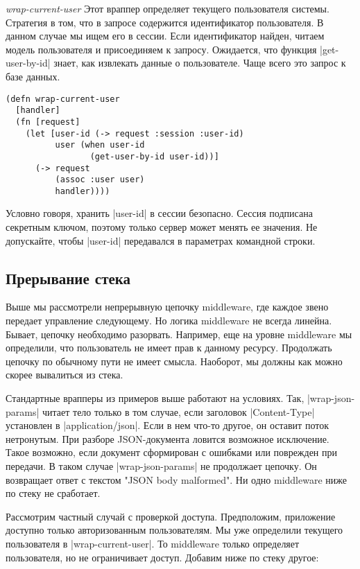\emph{wrap-current-user} Этот враппер определяет текущего пользователя
системы. Стратегия в том, что в запросе содержится идентификатор пользователя. В
данном случае мы ищем его в сессии. Если идентификатор найден, читаем модель
пользователя и присоединяем к запросу. Ожидается, что функция
\spverb|get-user-by-id| знает, как извлекать данные о пользователе. Чаще всего
это запрос к базе данных.

\begin{verbatim}
(defn wrap-current-user
  [handler]
  (fn [request]
    (let [user-id (-> request :session :user-id)
          user (when user-id
                 (get-user-by-id user-id))]
      (-> request
          (assoc :user user)
          handler))))
\end{verbatim}

Условно говоря, хранить \spverb|user-id| в сессии безопасно. Сессия подписана секретным
ключом, поэтому только сервер может менять ее значения. Не допускайте, чтобы
\spverb|user-id| передавался в параметрах командной строки.

\subsection{Прерывание стека}

Выше мы рассмотрели непрерывную цепочку middleware, где каждое звено передает
управление следующему. Но логика middleware не всегда линейна. Бывает, цепочку
необходимо разорвать. Например, еще на уровне middleware мы определили, что
пользователь не имеет прав к данному ресурсу. Продолжать цепочку по обычному
пути не имеет смысла. Наоборот, мы должны как можно скорее вывалиться из стека.

Стандартные врапперы из примеров выше работают на условиях. Так,
\spverb|wrap-json-params| читает тело только в том случае, если заголовок
\spverb|Content-Type| установлен в \spverb|application/json|. Если в нем что-то другое, он
оставит поток нетронутым. При разборе JSON-документа ловится возможное
исключение. Такое возможно, если документ сформирован с ошибками или поврежден
при передачи. В таком случае \spverb|wrap-json-params| не продолжает цепочку. Он
возвращает ответ с текстом "JSON body malformed". Ни одно middleware ниже по
стеку не сработает.

Рассмотрим частный случай с проверкой доступа. Предположим, приложение доступно
только авторизованным пользователям. Мы уже определили текущего пользователя в
\spverb|wrap-current-user|. То middleware только определяет пользователя, но не
ограничивает доступ. Добавим ниже по стеку другое:


